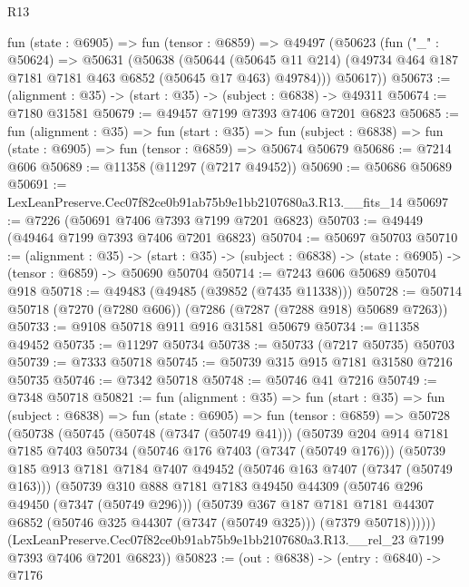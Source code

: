 \begin{lexlean}{R13}
\begin{coremodule}
  fun (state : @6905) =>
  fun (tensor : @6859) =>
  @49497
    (@50623
      (fun ("_" : @50624) =>
      @50631
        (@50638
          (@50644
            (@50645 @11 @214)
            (@49734 @464 @187 @7181 @7181 @463 @6852 (@50645 @17 @463) @49784)))
        @50617))
@50673 := (alignment : @35) -> (start : @35) -> (subject : @6838) -> @49311
@50674 := @7180 @31581
@50679 := @49457 @7199 @7393 @7406 @7201 @6823
@50685 := fun (alignment : @35) =>
  fun (start : @35) =>
  fun (subject : @6838) => fun (state : @6905) => fun (tensor : @6859) => @50674 @50679
@50686 := @7214 @606
@50689 := @11358 (@11297 (@7217 @49452))
@50690 := @50686 @50689
@50691 := LexLeanPreserve.Cec07f82ce0b91ab75b9e1bb2107680a3.R13.__fits_14
@50697 := @7226 (@50691 @7406 @7393 @7199 @7201 @6823)
@50703 := @49449 (@49464 @7199 @7393 @7406 @7201 @6823)
@50704 := @50697 @50703
@50710 := (alignment : @35) ->
  (start : @35) -> (subject : @6838) -> (state : @6905) -> (tensor : @6859) -> @50690 @50704
@50714 := @7243 @606 @50689 @50704 @918
@50718 := @49483 (@49485 (@39852 (@7435 @11338)))
@50728 := @50714 @50718 (@7270 (@7280 @606)) (@7286 (@7287 (@7288 @918) @50689 @7263))
@50733 := @9108 @50718 @911 @916 @31581 @50679
@50734 := @11358 @49452
@50735 := @11297 @50734
@50738 := @50733 (@7217 @50735) @50703
@50739 := @7333 @50718
@50745 := @50739 @315 @915 @7181 @31580 @7216 @50735
@50746 := @7342 @50718
@50748 := @50746 @41 @7216
@50749 := @7348 @50718
@50821 := fun (alignment : @35) =>
  fun (start : @35) =>
  fun (subject : @6838) =>
  fun (state : @6905) =>
  fun (tensor : @6859) =>
  @50728
    (@50738
      (@50745
        (@50748 (@7347 (@50749 @41)))
        (@50739
          @204
          @914
          @7181
          @7185
          @7403
          @50734
          (@50746 @176 @7403 (@7347 (@50749 @176)))
          (@50739
            @185
            @913
            @7181
            @7184
            @7407
            @49452
            (@50746 @163 @7407 (@7347 (@50749 @163)))
            (@50739
              @310
              @888
              @7181
              @7183
              @49450
              @44309
              (@50746 @296 @49450 (@7347 (@50749 @296)))
              (@50739
                @367
                @187
                @7181
                @7181
                @44307
                @6852
                (@50746 @325 @44307 (@7347 (@50749 @325)))
                (@7379 @50718))))))
      (LexLeanPreserve.Cec07f82ce0b91ab75b9e1bb2107680a3.R13.__rel_23
        @7199
        @7393
        @7406
        @7201
        @6823))
@50823 := (out : @6838) -> (entry : @6840) -> @7176

\end{coremodule}
\end{lexlean}
